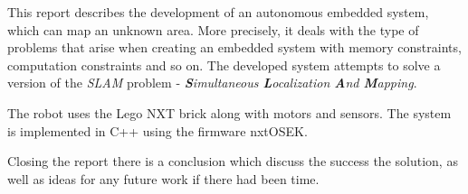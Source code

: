 This report describes the development of an autonomous embedded system, which can map an unknown area.
More precisely, it deals with the type of problems that arise when creating an embedded system with memory constraints, computation constraints and so on.
The developed system attempts to solve a version of the \emph{SLAM} problem - \emph{\textbf{S}imultaneous \textbf{L}ocalization \textbf{A}nd \textbf{M}apping}.

The robot uses the Lego NXT brick along with motors and sensors.
The system is implemented in C++ using the firmware nxtOSEK.

Closing the report there is a conclusion which discuss the success the solution, as well as ideas for any future work if there had been time.